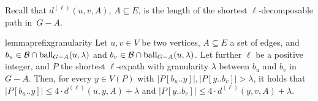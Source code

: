 \documentclass{article}\usepackage[a4paper,margin=20mm]{geometry}
\newcommand*{\B}{\mathcal{B}}
\newcommand*{\length}[1]{|#1|}
\newcommand*{\ball}{\mbox{\rm ball}}
\renewcommand{\le}{\leqslant}
\begin{document}
Recall that $d^{(\ell)}(u,v,A)$, $A \subseteq E$, is the length
of the shortest $\ell$-decomposable path in~$G{-}A$.

\begin{restatable}{lemma}{prefixgranularity}
\label{lemma:expath_with_granularity_lambda}
  Let $u,v \in V$ be two vertices, $A \subseteq E$ a set of edges,
  and $b_u \in \B \cap \ball_{G-A}(u,\lambda)$ and $b_v \in \B \cap \ball_{G-A}(u,\lambda)$.
  Let further $\ell$ be a positive integer, 
  and $P$ the shortest $\ell$-expath with granularity $\lambda$ between $b_u$ and $b_v$ in $G-A$.
  Then, for every $y \in V(P)$ with $|P[b_u..y]|,|P[y..b_v]| > \lambda$, it holds that
  $\length{P[b_u..y]} \le 4 \cdot d^{(\ell)}(u,y,A) + \lambda$ 
  and $\length{P[y..b_v]} \le 4 \cdot d^{(\ell)}(y,v,A) + \lambda$.
\end{restatable}
\end{document}
